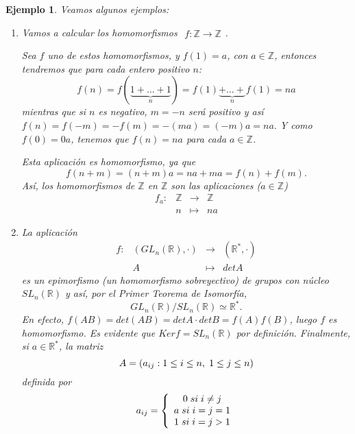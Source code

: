 \documentclass[12pt]{article}
\newtheorem{example}{Ejemplo}[theorem]
\begin{document}
\begin{example}Veamos algunos ejemplos:
\begin{enumerate}
\item Vamos a calcular los homomorfismos $
\begin{array}{rccl}
f\colon \mathbb{Z} \longrightarrow  \mathbb{Z}
\end{array}
$.

Sea $f$ uno de estos homomorfismos, y $f(1) = a$, con $a\in \mathbb{Z}$, entonces tendremos que para cada entero positivo $n$: $$f(n) = f(\underbrace{1+\ldots+1}_n) = f(1)\underbrace{ + \ldots + }_n f(1) = na$$
mientras que si $n$ es negativo, $m = -n$ será positivo y así $f(n) = f(-m) = -f(m) = -(ma) = (-m)a = na.$ Y como $f(0) = 0a$, tenemos que $f(n) = na$ para cada $a\in \mathbb{Z}$.

Esta aplicación es homomorfismo, ya que $$f(n+m) = (n+m)a = na + ma = f(n) + f(m).$$
Así, los homomorfismos de $\mathbb{Z}$ en $\mathbb{Z}$ son las aplicaciones ($a\in \mathbb{Z}$) $$\begin{array}{rccl}
f_{a}\colon &\mathbb{Z} & \longrightarrow & \mathbb{Z}\\
&n& \longmapsto &na
\end{array}
$$
\item La aplicación $$\begin{array}{rccl}
f\colon &(GL_{n}(\mathbb{R}), \cdot) & \longrightarrow & (\mathbb{R}^{\ast}, \cdot)\\
&A& \longmapsto &det A
\end{array}
$$ es un epimorfismo (un homomorfismo sobreyectivo) de grupos con núcleo $SL_{n}(\mathbb{R})$ y así, por el \textit{Primer Teorema de Isomorfía}, $$GL_{n}(\mathbb{R})/SL_{n}(\mathbb{R}) \simeq \mathbb{R}^{\ast}.$$
En efecto, $f(AB) = det(AB) = det A \cdot det B = f(A)f(B)$, luego $f$ es homomorfismo. Es evidente que $Ker f = SL_{n}(\mathbb{R})$ por definición. Finalmente, si $a \in \mathbb{R}^{\ast}$, la matriz $$A = (a_{ij} : 1 \leq i \leq n,\hspace{0.1cm} 1\leq j \leq n)$$ definida por  $$a_{ij} = \left\lbrace \begin{array}{c} 0\hspace{0.1cm} si \hspace{0.1cm} i\neq j\\ a\hspace{0.1cm} si \hspace{0.1cm}  i=j=1\\1\hspace{0.1cm} si \hspace{0.1cm}  i=j>1  \end{array}\right.$$

\end{enumerate}
\end{example}
\end{document}
